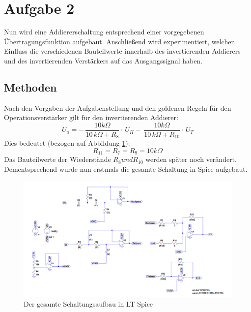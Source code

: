 \section{Aufgabe 2}
Nun wird eine Addiererschaltung entsprechend einer vorgegebenen Übertragungsfunktion aufgebaut. Anschließend wird experimentiert, welchen Einfluss die verschiedenen Bauteilwerte innerhalb des invertierenden Addierers und des invertierenden Verstärkers auf das Ausgangssignal haben.

\subsection{Methoden}


Nach den Vorgaben der Aufgabenstellung und den goldenen Regeln für den Operationsverstärker \cite{skript} gilt für den invertierenden Addierer:
\begin{equation}
U_{a}=-\,{\frac {10k\Omega }{10\,k\Omega +R_{8}}}\cdot\,U_{H}-\,{\frac {10k
\Omega}{10\,k\Omega +R_{10}}}\cdot\,U_{T}
\end{equation}
Dies bedeutet (bezogen auf Abbildung \ref{spicegesamt}):
\begin{equation}
R_{11}=R_{7}=R_{9}=10\si{k\Omega}
\end{equation}
Das Bauteilwerte der Wiederstände $R_{8} und  R_{10}$ werden später noch verändert.
Dementsprechend wurde nun erstmals die gesamte Schaltung in Spice aufgebaut.\newline

\begin{figure}[h]
\includegraphics[width=14cm]{pics/SpiceSchaltungGesamt.png}
\caption{Der gesamte Schaltungsaufbau in LT Spice}
\label{spicegesamt}
\end{figure}

